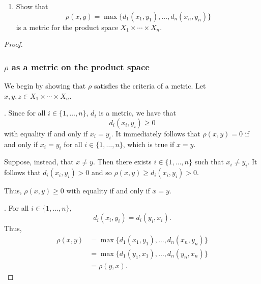 \begin{solution}
  \begin{enumerate}[label={(\alph*)}, align=left, leftmargin=\parindent, listparindent=\parindent, labelwidth=0pt, itemindent=!]
    \item
      Show that
      \begin{equation*}
        \rho(x, y) = \max\{ d_1(x_1, y_1), \ldots, d_n(x_n, y_n) \}
      \end{equation*}
      is a metric for the product space $X_1 \times \cdots \times X_n$.
  \end{enumerate}
  \begin{proof}~

    \subsubsection*{$\rho$ as a metric on the product space}
    We begin by showing that $\rho$ satisfies the criteria of a metric.
    Let $x, y, z \in X_1 \times \cdots \times X_n$.
    \bigskip

    . Since for all $i \in \{1, \ldots, n\}$, $d_i$ is a metric, we have that
    \begin{equation*}
      d_i(x_i, y_i) \geq 0
    \end{equation*}
    with equality if and only if $x_i = y_i$.
    It immediately follows that $\rho(x, y) = 0$ if and only if $x_i = y_i$ for all $i \in \{1, \ldots, n\}$, which is true if $x = y$.

    Suppose, instead, that $x \neq y$.
    Then there exists $i \in \{1, \ldots, n\}$ such that $x_i \neq y_i$.
    It follows that $d_i(x_i, y_i) > 0$ and so $\rho(x, y) \geq d_i(x_i, y_i) > 0$.

    Thus, $\rho(x, y) \geq 0$ with equality if and only if $x = y$.
    \bigskip

    . For all $i \in \{1, \ldots, n\}$,
    \begin{equation*}
      d_i(x_i, y_i) = d_i(y_i, x_i).
    \end{equation*}
    Thus,
    \begin{align*}
      \rho(x, y)  &= \max\{ d_1(x_1, y_1), \ldots, d_n(x_n, y_n) \} \\
                  &= \max\{ d_1(y_1, x_1), \ldots, d_n(y_n, x_n) \} \\
                  &= \rho(y, x).
    \end{align*}
    \bigskip


\end{proof}
\end{solution}
